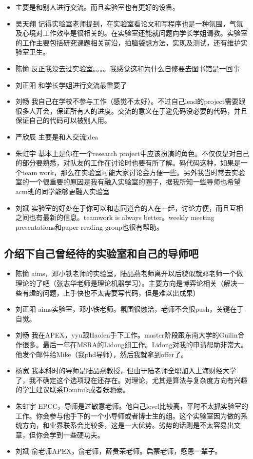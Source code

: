 \documentclass{vivid_layout}
\begin{document}
\begin{itemize}
\item 主要是和别人进行交流。而且实验室也有更好的设备。
\item { 吴天翔} \quad 记得实验室老师提到，在实验室看论文和写程序也是一种氛围，气氛及心境对工作效率是很相关的。在实验室还能就问题向学长学姐请教。实验室的工作主要包括研究课题相关前沿，拍脑袋想方法，实现及测试，还有维护实验室卫生。
\item  { 陈愉}  \quad 反正我没去过实验室。。。。我感觉这和为什么自修要去图书馆是一回事
\item  { 刘正阳}  \quad 和学长学姐进行交流最重要了
\item  { 刘畅}  \quad 我自己在学校不参与工作（感觉不太好）。不过自己lead的project需要跟很多人开会，保证所有人的进度。交流的意义在于避免码没必要的代码，并且保证自己的代码可以被别人用。
\item  { 严欣辰}  \quad 主要是和人交流idea
\item  { 朱虹宇}  \quad 基本上是你在一个research project中应该扮演的角色。不仅仅是对自己的部分要熟悉，对队友的工作在讨论时也要有所了解。码代码这种，如果是一个team work，那么在实验室可能大家讨论会方便一些。另外我当时常去实验室的一个很重要的原因是我有融入实验室的圈子，据我所知一些导师也希望acm班的同学能够更融入实验室
\item  { 刘斌}  \quad 实验室的好处在于你可以和志同道合的人在一起，讨论方便，而且互相之间也有最新的信息。teamwork is always better。weekly meeting presentations和paper reading group也很有帮助。
\end{itemize}

\subsection{介绍下自己曾经待的实验室和自己的导师吧}
\begin{itemize}
\item  { 陈愉}  \quad  aims，邓小铁老师的实验室，陆品燕老师离开以后貌似就邓老师一个做理论的了吧（张志华老师是理论机器学习）。主要方向是博弈论相关（解决一些有趣的问题，上手快也不太需要写代码，但是难以出成果）
\item  { 刘正阳}  \quad aims实验室，邓小铁老师。氛围很融洽，老师不会很push，关键在于自觉。
\item  { 刘畅}  \quad 我在APEX，yyu跟Haofen手下工作。master阶段跟东南大学的Guilin合作很多。最后一年在MSRA的Lidong组工作。Lidong对我的申请帮助非常大。他发个邮件给Mike（我phd导师），然后我就拿到offer了。
\item  { 杨宽}  \quad 我本科时的导师是陆品燕教授，但由于陆老师全职加入上海财经大学了，我不确定这个选项现在还存在。对理论，尤其是算法与复杂度方向有兴趣的学生建议联系Dominik或者张驰豪。
\item  { 朱虹宇}  \quad EPCC，导师是过敏意老师。他自己level比较高，平时不太抓实验室的工作。你会参与他手下的一个小导师或者博士生的组。这个实验室因为做的系统方向，和业界联系会比较多，这是一大优势。劣势的话则是不太容易出文章，但你会学到一些硬功夫。
\item  { 刘斌}  \quad 俞老师APEX，俞老师，薛贵荣老师。启蒙老师，感恩一辈子。
\end{itemize}
\end{document}
